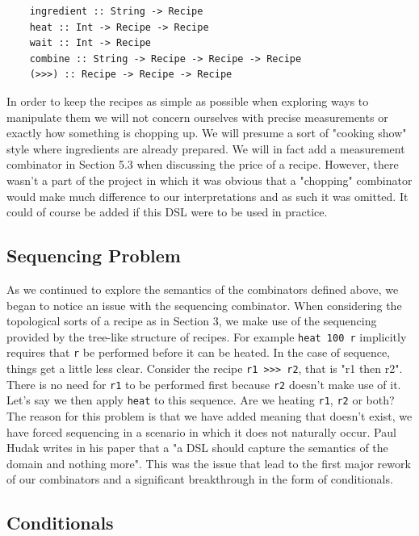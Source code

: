 \documentclass[11pt]{article}
\begin{document}
\begin{lstlisting}
    ingredient :: String -> Recipe
    heat :: Int -> Recipe -> Recipe
    wait :: Int -> Recipe
    combine :: String -> Recipe -> Recipe -> Recipe
    (>>>) :: Recipe -> Recipe -> Recipe
\end{lstlisting}

In order to keep the recipes as simple as possible when exploring ways to manipulate them
we will not concern ourselves with precise measurements or exactly how something is chopping
up. We will presume a sort of "cooking show" style where ingredients are already prepared.
We will in fact add a measurement combinator in Section 5.3 when discussing the price of a recipe.
However, there wasn't a part of the project in which it was obvious that a "chopping" combinator
would make much difference to our interpretations and as such it was omitted. It could of course
be added if this DSL were to be used in practice.

\subsection{Sequencing Problem}

As we continued to explore the semantics of the combinators defined above, we began to
notice an issue with the sequencing combinator. When considering the topological sorts
of a recipe as in Section 3, we make use of the sequencing provided by the tree-like structure
of recipes. For example \texttt{heat 100 r} implicitly requires that \texttt{r} be performed
before it can be heated. In the case of sequence, things get a little less clear. Consider
the recipe \texttt{r1 >>> r2}, that is "r1 then r2". There is no need for \texttt{r1} to be
performed first because \texttt{r2} doesn't make use of it. Let's say we then apply \texttt{heat}
to this sequence. Are we heating \texttt{r1}, \texttt{r2} or both? The reason for this problem
is that we have added meaning that doesn't exist, we have forced sequencing in a scenario
in which it does not naturally occur. Paul Hudak writes in his paper \cite{hudak} that a
"a DSL should capture the semantics of the domain and nothing more". This was the issue
that lead to the first major rework of our combinators and a significant breakthrough
in the form of conditionals.

\subsection{Conditionals}
\end{document}

